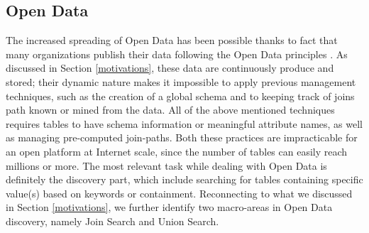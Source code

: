 \subsection{Open Data}
The increased spreading of Open Data has been possible thanks to fact that many organizations publish their data following the Open Data principles \cite{bizer2009linked}. As discussed in Section \ref{motivations}, these data are continuously produce and stored; their dynamic nature makes it impossible to apply previous management techniques, such as the creation of a global schema \cite{10.1145/27633.27634} and to keeping track of joins path known or mined from the data\cite{fagin2009clio,deng2017data}. All of the above mentioned techniques requires tables to have schema information or meaningful attribute names, as well as managing pre-computed join-paths. Both these practices are impracticable for an open platform at Internet scale, since the number of tables can easily reach millions or more. The most relevant task while dealing with Open Data is definitely the discovery part, which include searching for tables containing specific value(s) based on keywords \cite{brickley2019google} or containment. Reconnecting to what we discussed in Section \ref{motivations}, we further identify two macro-areas in Open Data discovery, namely Join Search and Union Search.
\bigbreak

